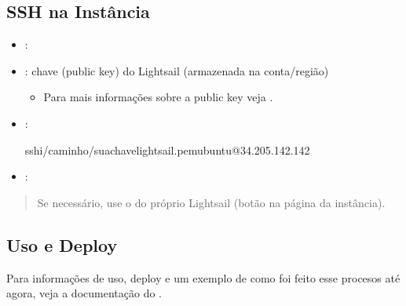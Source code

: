 \documentclass[letterpaper,10pt,brazil]{sphinxmanual}
\begin{document}
\subsection{SSH na Instância}
\label{\detokenize{sistemas/aws:ssh-na-instancia}}\begin{itemize}
\item {} 
\sphinxAtStartPar
{}: 

\item {} 
\sphinxAtStartPar
{}: chave  (public key) do Lightsail (armazenada na conta/região)
\begin{itemize}
\item {} 
\sphinxAtStartPar
Para mais informações sobre a public key veja {\hyperref[\detokenize{sistemas/aws:publickey}]{}}.

\end{itemize}

\item {} 
\sphinxAtStartPar
{}:

\begin{sphinxVerbatim}[commandchars=\\\{\}]
ssh\PYGZhy{}i/caminho/sua\PYGZhy{}chave\PYGZhy{}lightsail.pemubuntu@34.205.142.142
\end{sphinxVerbatim}

\item {} 
\sphinxAtStartPar
{}: 

\end{itemize}
\begin{quote}

\sphinxAtStartPar
Se necessário, use o  do próprio Lightsail (botão  na página da instância).
\end{quote}


\subsection{Uso e Deploy}
\label{\detokenize{sistemas/aws:uso-e-deploy}}
\sphinxAtStartPar
Para informações de uso, deploy e um exemplo de como foi feito esse procesos até agora, veja a documentação do .
\end{document}
